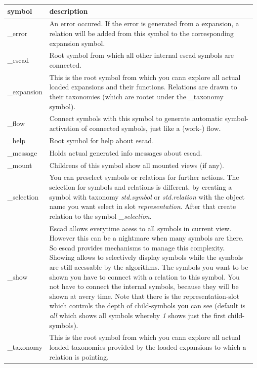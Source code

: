 \documentclass[a4paper, 12pt, openany]{scrbook}
\begin{document}
\begin{table}[htbp]
\centering
\begin{tabular}{|p{4cm}|p{12cm}|}
  \hline
  \textbf{symbol} & \textbf{description} \\
  \hline
  \_error & An error occured. If the error is generated from a expansion, a relation will be added from this symbol to the corresponding expansion symbol. \\
  \hline
  \_escad & Root symbol from which all other internal escad symbols are connected. \\
  \hline
  \_expansion & This is the root symbol from which you cann explore all actual loaded expansions and their functions. Relations are drawn to their taxonomies (which are rootet under the \_taxonomy symbol). \\
  \hline
  \_flow & Connect symbols with this symbol to generate automatic symbol-activation of connected symbols, just like a (work-) flow. \\
  \hline
  \_help & Root symbol for help about escad. \\
  \hline
  \_message & Holds actual generated info messages about escad. \\
  \hline
  \_mount & Childrens of this symbol show all mounted views (if any). \\
  \hline
  \_selection & You can preselect symbols or relations for further actions. The selection for symbols and relations is different. by creating a symbol with taxonomy \emph{std.symbol} or \emph{std.relation} with the object name you want select in slot \emph{representation}. After that create relation to the symbol \emph{\_selection}. \\
  \hline
  \_show & Escad allows everytime acess to all symbols in current view. However this can be a nightmare when many symbols are there. So escad provides mechanisms to manage this complexity. Showing allows to selectively display symbols while the symbols are still acessable by the algorithms. The symbols you want to be shown you have to connect with a relation to this symbol. You not have to connect the internal symbols, because they will be shown at avery time. Note that there is the representation-slot which controls the depth of child-symbols you can see (default is \emph{all} which shows all symbols whereby \emph{1} shows just the first child-symbols). \\
  \hline
  \_taxonomy & This is the root symbol from which you cann explore all actual loaded taxonomies provided by the loaded expansions to which a relation is pointing. \\

\end{tabular}
\end{table}
\end{document}

